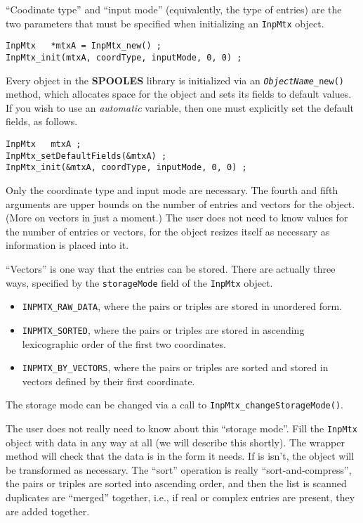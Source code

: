 ``Coodinate type'' and ``input mode'' (equivalently, the type of
entries) are the two parameters that must be specified when
initializing an {\tt InpMtx} object.
\begin{verbatim}
InpMtx   *mtxA = InpMtx_new() ;
InpMtx_init(mtxA, coordType, inputMode, 0, 0) ;
\end{verbatim}
Every object in the {\bf SPOOLES} library is initialized
via an {\tt {\it ObjectName}\_new()} method, which allocates space
for the object and sets its fields to default values.
If you wish to use an {\it automatic} variable, then one must
explicitly set the default fields, as follows.
\begin{verbatim}
InpMtx   mtxA ;
InpMtx_setDefaultFields(&mtxA) ;
InpMtx_init(&mtxA, coordType, inputMode, 0, 0) ;
\end{verbatim}
Only the coordinate type and input mode are necessary.
The fourth and fifth arguments are upper bounds on the number of
entries and vectors for the object. (More on vectors in just a
moment.) The user does not need to know values for the number of
entries or vectors, for the object resizes itself as necessary 
as information is placed into it.
\par
``Vectors'' is one way that the entries can be stored.
There are actually three ways, specified by the 
{\tt storageMode} field of the {\tt InpMtx} object.
\begin{itemize}
\item
{\tt INPMTX\_RAW\_DATA}, where the pairs or triples are stored in
unordered form.
\item
{\tt INPMTX\_SORTED}, where the pairs or triples are stored in
ascending lexicographic order of the first two coordinates.
\item
{\tt INPMTX\_BY\_VECTORS}, where the pairs or triples are sorted
and stored in vectors defined by their first coordinate.
\end{itemize}
The storage mode can be changed via a call to
{\tt InpMtx\_changeStorageMode()}.
\par
The user does not really need to know about this 
``storage mode''. Fill the {\tt InpMtx} object with data in any way
at all (we will describe this shortly). 
The wrapper method will check that the data is in the form it needs. 
If is isn't, the object will be transformed as necessary.
The ``sort'' operation is really ``sort-and-compress'', the pairs
or triples are sorted into ascending order, and then the list is
scanned duplicates are ``merged'' together, i.e., if real or
complex entries are present, they are added together.
